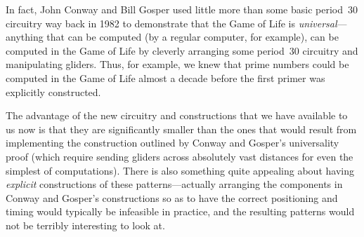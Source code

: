 In fact, John Conway and Bill Gosper used little more than some basic period~$30$ circuitry way back in 1982 \cite[Chapter~25]{BCG82} to demonstrate that the Game of Life is \emph{universal}---anything that can be computed (by a regular computer, for example), can be computed in the Game of Life by cleverly arranging some period~$30$ circuitry and manipulating gliders. Thus, for example, we knew that prime numbers could be computed in the Game of Life almost a decade before the first primer was explicitly constructed.

The advantage of the new circuitry and constructions that we have available to us now is that they are significantly smaller than the ones that would result from implementing the construction outlined by Conway and Gosper's universality proof  (which require sending gliders across absolutely vast distances for even the simplest of computations). There is also something quite appealing about having \emph{explicit} constructions of these patterns---actually arranging the components in Conway and Gosper's constructions so as to have the correct positioning and timing would typically be infeasible in practice, and the resulting patterns would not be terribly interesting to look at.



